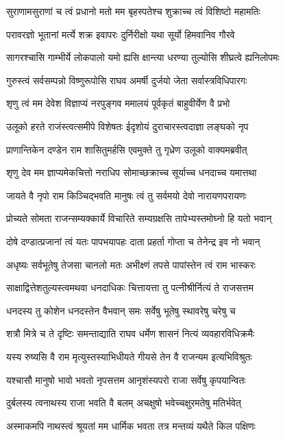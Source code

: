 \twolineshloka
{सुराणामसुराणां च त्वं प्रधानो मतो मम}
{बृहस्पतेश्च शुक्राच्च त्वं विशिष्टो महामतिः}%

\twolineshloka
{परावरज्ञो भूतानां मर्त्ये शक्र इवापरः}
{दुर्निरीक्षो यथा सूर्यो हिमवानिव गौरवे}%

\twolineshloka
{सागरश्चासि गाम्भीर्ये लोकपालो यमो ह्यसि}
{क्षान्त्या धरण्या तुल्योसि शीघ्रत्वे ह्यनिलोपमः}%

\twolineshloka
{गुरुस्त्वं सर्वसम्पन्नो विष्णुरूपोसि राघव}
{अमर्षी दुर्जयो जेता सर्वास्त्रविधिपारगः}%

\twolineshloka
{शृणु त्वं मम देवेश विज्ञाप्यं नरपुङ्गव}
{ममालयं पूर्वकृतं बाहुवीर्येण वै प्रभो}%

\twolineshloka
{उलूको हरते राजंस्त्वत्समीपे विशेषतः}
{ईदृशोयं दुराचारस्त्वदाज्ञा लङ्घको नृप}%

\twolineshloka
{प्राणान्तिकेन दण्डेन राम शासितुमर्हसि}
{एवमुक्ते तु गृध्रेण उलूको वाक्यमब्रवीत्}%

\twolineshloka
{शृणु देव मम ज्ञाप्यमेकचित्तो नराधिप}
{सोमाच्छक्राच्च सूर्याच्च धनदाच्च यमात्तथा}%

\twolineshloka
{जायते वै नृपो राम किञ्चिद्भवति मानुषः}
{त्वं तु सर्वमयो देवो नारायणपरायणः}%

\twolineshloka
{प्रोच्यते सोमता राजन्सम्यक्कार्ये विचारिते}
{सम्यग्रक्षसि तापेभ्यस्तमोघ्नो हि यतो भवान्}%

\twolineshloka
{दोषे दण्डात्प्रजानां त्वं यतः पापभयापहः}
{दाता प्रहर्ता गोप्ता च तेनेन्द्र इव नो भवान्}%

\twolineshloka
{अधृष्यः सर्वभूतेषु तेजसा चानलो मतः}
{अभीक्ष्णं तपसे पापांस्तेन त्वं राम भास्करः}%

\twolineshloka
{साक्षाद्वित्तेशतुल्यस्त्वमथवा धनदाधिकः}
{चित्तायत्ता तु पत्नीश्रीर्नित्यं ते राजसत्तम}%

\twolineshloka
{धनदस्य तु कोशेन धनदस्तेन वैभवान्}
{समः सर्वेषु भूतेषु स्थावरेषु चरेषु च}%

\twolineshloka
{शत्रौ मित्रे च ते दृष्टिः समन्ताद्याति राघव}
{धर्मेण शासनं नित्यं व्यवहारविधिक्रमैः}%

\twolineshloka
{यस्य रुष्यसि वै राम मृत्युस्तस्याभिधीयते}
{गीयसे तेन वै राजन्यम इत्यभिविश्रुतः}%

\twolineshloka
{यश्चासौ मानुषो भावो भवतो नृपसत्तम}
{आनृशंस्यपरो राजा सर्वेषु कृपयान्वितः}%

\twolineshloka
{दुर्बलस्य त्वनाथस्य राजा भवति वै बलम्}
{अचक्षुषो भवेच्चक्षुरमतेषु मतिर्भवेत्}%

\twolineshloka
{अस्माकमपि नाथस्त्वं श्रूयतां मम धार्मिक}
{भवता तत्र मन्तव्यं यथैते किल पक्षिणः}%

